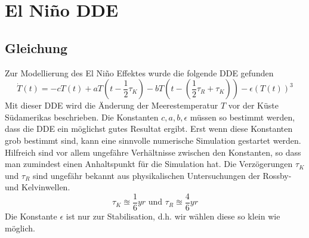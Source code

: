 \section{El Niño DDE}


\subsection{Gleichung}
Zur Modellierung des El Niño Effektes wurde die folgende DDE gefunden %
\begin{equation} \label{eldde}
\dot{T}(t)=-cT(t)+aT(t-\frac{1}{2}\tau_K)-bT(t-(\frac{1}{2}\tau_R+\tau_K))-\epsilon(T(t))^3
\end{equation}
Mit dieser DDE wird die Änderung der Meerestemperatur $T$ vor der Küste Südamerikas beschrieben.
Die Konstanten $c,a,b,\epsilon$ müssen so bestimmt werden, dass die DDE ein möglichst gutes Resultat ergibt.
Erst wenn diese Konstanten grob bestimmt sind, kann eine sinnvolle numerische Simulation gestartet werden.
Hilfreich sind vor allem ungefähre Verhältnisse zwischen den Konstanten, so dass man zumindest einen Anhaltspunkt für die Simulation hat.
Die Verzögerungen $\tau_K$ und $\tau_R$ sind ungefähr bekannt aus physikalischen Untersuchungen der Rossby- und Kelvinwellen.
\begin{equation}
	\tau_K \approxeq \frac{1}{6}yr \text{ und } \tau_R \approxeq \frac{4}{6}yr
\end{equation}
Die Konstante $\epsilon$ ist nur zur Stabilisation, d.h. wir wählen diese so klein wie möglich.



